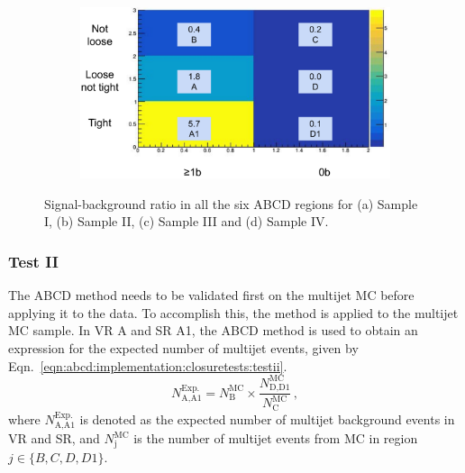 \begin{figure}[hbt!]
\begin{subfigure}{.48\textwidth}
		\caption{}
		\label{fig:abcd:implementation:closuretests:testi:sampleiii}
	\end{subfigure}\hspace{0.3cm}
	\begin{subfigure}{.48\textwidth}
		\centering
		\includegraphics[width=\linewidth,height=\textheight,keepaspectratio]{sampleiv.png}
		\caption{}
		\label{fig:abcd:implementation:closuretests:testi:sampleiv}
	\end{subfigure}
	\caption{Signal-background ratio in all the six ABCD regions for (a) Sample I, (b) Sample II, (c) Sample III and (d) Sample IV.}
	\label{fig:abcd:implementation:closuretests:testi}
\end{figure}


\subsubsection{Test II}
\label{sec:abcd:implementation:closuretests:testii}
The ABCD method needs to be validated first on the multijet MC before applying it to the data. To accomplish this, the method is applied to the multijet MC sample. In VR A and SR A1, the ABCD method is used to obtain an expression for the expected number of multijet events, given by Eqn.\ \ref{eqn:abcd:implementation:closuretests:testii}. 
\begin{equation}
	N_{\text{A,A1}}^{\text{Exp.}} = N_{\text{B}}^{\text{MC}} \times \frac{N_{\text{D,D1}}^{\text{MC}}}{N_{\text{C}}^{\text{MC}}} \,,
	\label{eqn:abcd:implementation:closuretests:testii}
\end{equation}
where $N_{\text{A,A1}}^{\text{Exp.}}$ is denoted as the expected number of multijet background events in VR and SR, and $N_{\text{j}}^{\text{MC}}$ is the number of multijet events from MC in region $j\in\{B, C, D, D1\}$. 

